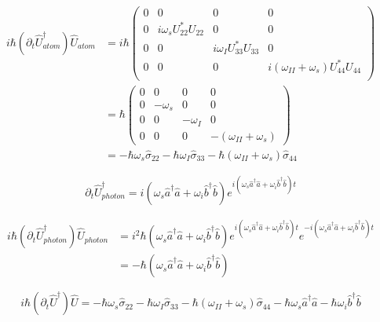 \documentclass[aps,pra,showpacs,amsmath,amssymb,nofootinbib,longbibliography,superscriptaddress
]{revtex4-1}
\theoremstyle{definition}
\theoremstyle{remark}
\newcommand{\0}{\hat{0}}
\begin{document}
\begin{align}
    i \hbar (\partial_t \hat{U}_{atom}^{\dagger}) \hat{U}_{atom}
    &=
    i \hbar \left(\begin{array}{cccc}
        0 & 0 & 0 & 0\\
        0 & i \omega_s U_{22}^{*} U_{22} & 0 & 0\\
        0 & 0 & i \omega_I U_{33}^{*} U_{33} & 0\\
        0 & 0 & 0 & i(\omega_{II} + \omega_s)U_{44}^{*} U_{44}\\
    \end{array}\right) \nonumber\\
    &=
    \hbar \left(\begin{array}{cccc}
        0 & 0 & 0 & 0\\
        0 & -\omega_s & 0 & 0\\
        0 & 0 & -\omega_I & 0\\
        0 & 0 & 0 & -(\omega_{II} + \omega_s)
    \end{array}\right)\nonumber\\
    &=
    -\hbar \omega_s \hat{\sigma}_{22} - \hbar \omega_I \hat{\sigma}_{33} - \hbar (\omega_{II} + \omega_s) \hat{\sigma}_{44}
\end{align}

\begin{equation}
    \partial_t \hat{U}_{photon}^{\dagger} =
    i(\omega_s \hat{a}^{\dagger} \hat{a} +
    \omega_i \hat{b}^{\dagger} \hat{b}) e^{i(\omega_s \hat{a}^{\dagger} \hat{a} +
    \omega_i \hat{b}^{\dagger} \hat{b})t}
\end{equation}

\begin{align}
    i \hbar (\partial_t \hat{U}_{photon}^{\dagger}) \hat{U}_{photon}
    &=
    i^2 \hbar (\omega_s \hat{a}^{\dagger} \hat{a} +
    \omega_i \hat{b}^{\dagger} \hat{b}) e^{i(\omega_s \hat{a}^{\dagger} \hat{a} +
    \omega_i \hat{b}^{\dagger} \hat{b})t} e^{-i(\omega_s \hat{a}^{\dagger} \hat{a} +
    \omega_i \hat{b}^{\dagger} \hat{b})t}\nonumber\\
    &=
    -\hbar (\omega_s \hat{a}^{\dagger} \hat{a} + \omega_i \hat{b}^{\dagger} \hat{b})
\end{align}

\begin{equation}
    i \hbar (\partial_t \hat{U}^{\dagger}) \hat{U} =
    -\hbar \omega_s \hat{\sigma}_{22} -
    \hbar \omega_I \hat{\sigma}_{33} -
    \hbar (\omega_{II} + \omega_s) \hat{\sigma}_{44} -
    \hbar \omega_s \hat{a}^{\dagger} \hat{a} -
    \hbar \omega_i \hat{b}^{\dagger} \hat{b}
\end{equation}
\end{document}

